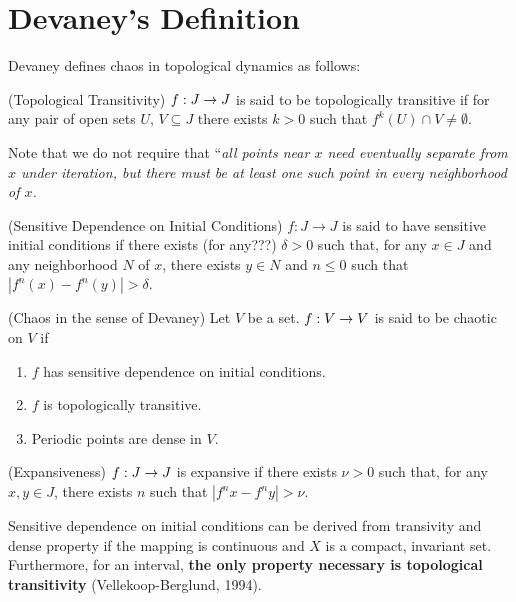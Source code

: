 \documentclass[11pt]{article}
\begin{document}
\section{Devaney's Definition}
Devaney defines chaos in topological dynamics as follows:

\begin{definition}
  (Topological Transitivity) $f: J \rightarrow J$ is said to be topologically
  transitive if for any pair of open sets $U$, $V \subseteq J$
  there exists $k > 0$ such that $f^k(U) \cap V \neq \emptyset$.
  \label{defn:transitivity}
\end{definition}

Note that we do not require that
``\it{all} points near $x$ need eventually separate from $x$
under iteration, but there must be at least one such point in
every neighborhood of $x$.
\begin{definition}
  (Sensitive Dependence on Initial Conditions) $f: J \rightarrow J$ 
  is said to have sensitive initial conditions if there exists (for any???) $\delta > 0$
  such that, for any $x \in J$ and any neighborhood $N$ of $x$,
  there exists $y\in N$ and $n\leq 0$ such that $|f^n(x) - f^n(y)|>\delta$.
  \label{defn:sdic}
\end{definition}

\begin{definition}
  (Chaos in the sense of Devaney) Let $V$ be a set. $f: V\rightarrow V$ is said to be chaotic on $V$ if
  \begin{enumerate}
    \item $f$ has sensitive dependence on initial conditions.
    \item $f$ is topologically transitive.
    \item Periodic points are dense in $V$.
  \end{enumerate}
\end{definition}


\begin{definition}
  (Expansiveness) $f: J\rightarrow J$ is expansive if there exists $\nu > 0$
  such that, for any $x,y\in J$, there exists $n$ such that
  $|f^nx-f^ny| > \nu$.
\end{definition}

Sensitive dependence on initial conditions can be derived from transivity and dense property if the mapping
is continuous and $X$ is a compact, invariant set. \cite{banks}
Furthermore, for an interval, {\bf the only property necessary is
topological transitivity} (Vellekoop-Berglund, 1994).
\end{document}
